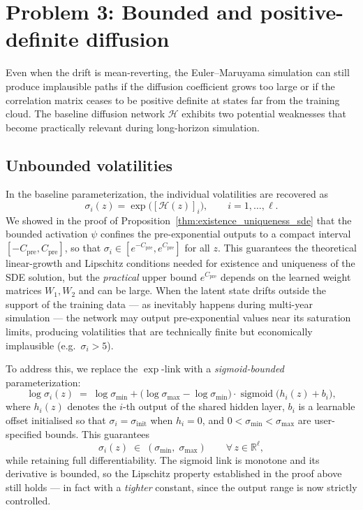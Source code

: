 \section{Problem 3: Bounded and positive-definite diffusion}
\label{sec:stable_diffusion}

Even when the drift is mean-reverting, the Euler--Maruyama simulation can still produce implausible paths if the diffusion coefficient grows too large or if the correlation matrix ceases to be positive definite at states far from the training cloud.
The baseline diffusion network $\mathcal{H}$ exhibits two potential weaknesses that become practically relevant during long-horizon simulation.

\subsection{Unbounded volatilities}

In the baseline parameterization, the individual volatilities are recovered as
\[
\sigma_i(z) = \exp\bigl([\mathcal{H}(z)]_i\bigr), \qquad i = 1,\ldots,\ell.
\]
We showed in the proof of Proposition~\ref{thm:existence_uniqueness_sde} that the bounded activation $\psi$ confines the pre-exponential outputs to a compact interval $[-C_{\mathrm{pre}}, C_{\mathrm{pre}}]$, so that $\sigma_i \in [e^{-C_{\mathrm{pre}}}, e^{C_{\mathrm{pre}}}]$ for all $z$.
This guarantees the theoretical linear-growth and Lipschitz conditions needed for existence and uniqueness of the SDE solution, but the \emph{practical} upper bound $e^{C_{\mathrm{pre}}}$ depends on the learned weight matrices $W_1,W_2$ and can be large.
When the latent state drifts outside the support of the training data --- as inevitably happens during multi-year simulation --- the network may output pre-exponential values near its saturation limits, producing volatilities that are technically finite but economically implausible (e.g.\ $\sigma_i > 5$).

To address this, we replace the $\exp$-link with a \emph{sigmoid-bounded} parameterization:
\[
\log\sigma_i(z) \;=\; \log\sigma_{\min}
  + \bigl(\log\sigma_{\max} - \log\sigma_{\min}\bigr)
    \cdot \operatorname{sigmoid}\!\bigl(h_i(z) + b_i\bigr),
\]
where $h_i(z)$ denotes the $i$-th output of the shared hidden layer, $b_i$ is a learnable offset initialised so that $\sigma_i = \sigma_{\mathrm{init}}$ when $h_i = 0$, and $0 < \sigma_{\min} < \sigma_{\max}$ are user-specified bounds.
This guarantees
\[
\sigma_i(z) \;\in\; (\sigma_{\min},\;\sigma_{\max}) \qquad \forall\, z \in \mathbb{R}^\ell,
\]
while retaining full differentiability. The sigmoid link is monotone and its derivative is bounded, so the Lipschitz property established in the proof above still holds --- in fact with a \emph{tighter} constant, since the output range is now strictly controlled.

